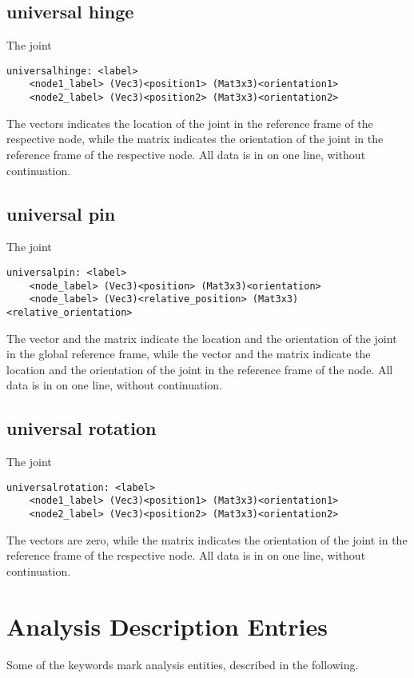 \subsection{universal hinge}
The  joint
\begin{verbatim}
universalhinge: <label>
    <node1_label> (Vec3)<position1> (Mat3x3)<orientation1>
    <node2_label> (Vec3)<position2> (Mat3x3)<orientation2>
\end{verbatim}
The  vectors indicates the location of the joint
in the reference frame of the respective node,
while the matrix  indicates the orientation of the joint
in the reference frame of the respective node.
All data is in on one line, without continuation.

\subsection{universal pin}
The  joint
\begin{verbatim}
universalpin: <label>
    <node_label> (Vec3)<position> (Mat3x3)<orientation>
    <node_label> (Vec3)<relative_position> (Mat3x3)<relative_orientation>
\end{verbatim}
The  vector and the  matrix indicate 
the location and the orientation of the joint in the global reference frame, 
while the  vector
and the  matrix indicate
the location and the orientation of the joint
in the reference frame of the node.
All data is in on one line, without continuation.

\subsection{universal rotation}
The  joint
\begin{verbatim}
universalrotation: <label>
    <node1_label> (Vec3)<position1> (Mat3x3)<orientation1>
    <node2_label> (Vec3)<position2> (Mat3x3)<orientation2>
\end{verbatim}
The  vectors are zero,
while the matrix  indicates the orientation of the joint
in the reference frame of the respective node.
All data is in on one line, without continuation.


\section{Analysis Description Entries}
Some of the keywords mark analysis entities, described in the following.

